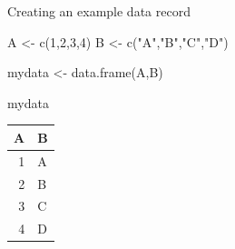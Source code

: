 \documentclass[
  10pt,
  ignorenonframetext,
]{beamer}
\newenvironment{Shaded}{\begin{snugshade}}{\end{snugshade}}
\newcommand{\DecValTok}[1]{\textcolor[rgb]{0.86,0.86,0.80}{#1}}
\newcommand{\KeywordTok}[1]{\textcolor[rgb]{0.94,0.87,0.69}{#1}}
\newcommand{\NormalTok}[1]{\textcolor[rgb]{0.80,0.80,0.80}{#1}}
\newcommand{\StringTok}[1]{\textcolor[rgb]{0.80,0.58,0.58}{#1}}
\begin{document}
\begin{frame}[fragile]{Creating an example data record}
\protect\hypertarget{creating-an-example-data-record}{}

\begin{Shaded}
\begin{Highlighting}[]
\NormalTok{A <-}\StringTok{ }\KeywordTok{c}\NormalTok{(}\DecValTok{1}\NormalTok{,}\DecValTok{2}\NormalTok{,}\DecValTok{3}\NormalTok{,}\DecValTok{4}\NormalTok{)}
\NormalTok{B <-}\StringTok{ }\KeywordTok{c}\NormalTok{(}\StringTok{"A"}\NormalTok{,}\StringTok{"B"}\NormalTok{,}\StringTok{"C"}\NormalTok{,}\StringTok{"D"}\NormalTok{)}

\NormalTok{mydata <-}\StringTok{ }\KeywordTok{data.frame}\NormalTok{(A,B)}
\end{Highlighting}
\end{Shaded}

\begin{Shaded}
\begin{Highlighting}[]
\NormalTok{mydata}
\end{Highlighting}
\end{Shaded}

\begin{longtable}[]{@{}rl@{}}
\toprule
A & B\tabularnewline
\midrule
\endhead
1 & A\tabularnewline
2 & B\tabularnewline
3 & C\tabularnewline
4 & D\tabularnewline
\bottomrule
\end{longtable}

\end{frame}
\end{document}

